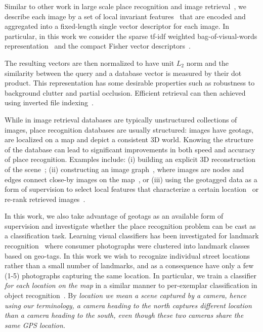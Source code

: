   Similar to other work in large scale place recognition \cite{Cummins09,Knopp2010,Schindler07,Torii2013} and image retrieval~\cite{Nister06,Philbin07,Sivic03,Jegou12}, we describe each image by a set of local invariant features~\cite{Bay06,Lowe04} that are encoded and aggregated into a fixed-length single vector descriptor for each image. In particular, in this work we consider the sparse tf-idf weighted bag-of-visual-words representation~\cite{Sivic03,Philbin07} and the compact Fisher vector descriptors~\cite{Jegou12}.  
  
  The resulting vectors are then normalized to have unit $L_2$ norm and the similarity between the query and a database vector is measured by their dot product. This representation has some desirable properties such as robustness to background clutter and partial occlusion. Efficient retrieval can then achieved using inverted file indexing~\cite{Jegou11}.


  While in image retrieval  databases are typically unstructured collections of images, place recognition databases are usually structured: images have geotags, are localized on a map and depict a consistent 3D world.
  Knowing the structure of the database can lead to significant improvements in both speed and accuracy of place recognition. 
  Examples include: (i) building an explicit 3D reconstruction of the scene~\cite{Irschara2009,Li10,Li12}; (ii) constructing an image graph~\cite{Cao13,Philbin10c,Turcot09}, where images are nodes and edges connect close-by images on the map~\cite{Torii11}, or (iii) using the geotagged data as a form of supervision to select local features that characterize a certain location~\cite{Knopp2010,Schindler07} or re-rank retrieved images~\cite{Zamir10}.

  In this work, we also take advantage of geotags as an available form of supervision and investigate whether the place recognition problem can be cast as a classification task.
  {
    Learning visual classifiers has been investigated for landmark recognition~\cite{Li09} where consumer photographs were clustered into landmark classes based on geo-tags. 
    In this work we wish to recognize individual street locations rather than a small number of landmarks, and as a consequence have only a few (1-5) photographs
    \textcolor{petr}{capturing the same location}.
    In particular, we train a classifier {\em for each location on the map} in a similar manner to per-exemplar classification in object recognition~\cite{Malisiewicz11}. 
    \textcolor{petr}{
      By \em{location} we mean a scene captured by a camera, hence using our terminology, a camera heading to the north captures different location than a camera heading to the south, even though these two cameras share the same GPS location. 
    }
  }


